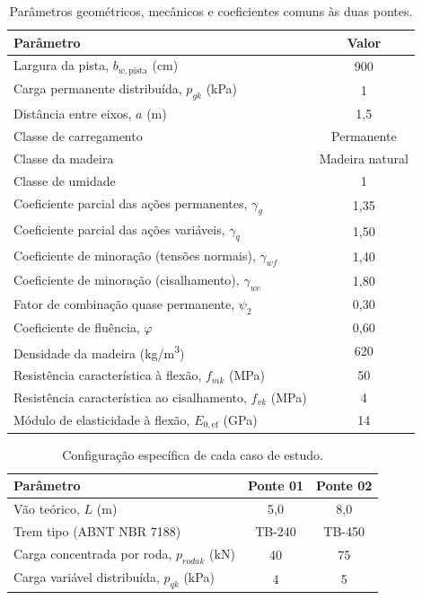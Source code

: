 \begin{table}[!ht]
\caption{Parâmetros geométricos, mecânicos e coeficientes comuns às duas pontes.\label{tab:parametros}}
\begin{threeparttable}
\begin{tabular*}{\columnwidth}{@{\extracolsep\fill}lc@{\extracolsep\fill}}
\toprule
Parâmetro & Valor \\
\midrule
Largura da pista, $b_{w,\mathrm{pista}}$ (cm) & 900 \\
Carga permanente distribuída, $p_{gk}$ (kPa) & 1 \\
Distância entre eixos, $a$ (m) & 1{,}5 \\
Classe de carregamento & Permanente \\
Classe da madeira & Madeira natural \\
Classe de umidade & 1 \\
Coeficiente parcial das ações permanentes, $\gamma_g$ & 1{,}35 \\
Coeficiente parcial das ações variáveis, $\gamma_q$ & 1{,}50 \\
Coeficiente de minoração (tensões normais), $\gamma_{wf}$ & 1{,}40 \\
Coeficiente de minoração (cisalhamento), $\gamma_{wc}$ & 1{,}80 \\
Fator de combinação quase permanente, $\psi_2$ & 0{,}30 \\
Coeficiente de fluência, $\varphi$ & 0{,}60 \\
Densidade da madeira (kg/m\textsuperscript{3}) & 620 \\
Resistência característica à flexão, $f_{mk}$ (MPa) & 50 \\
Resistência característica ao cisalhamento, $f_{vk}$ (MPa) & 4 \\
Módulo de elasticidade à flexão, $E_{0,\mathrm{ef}}$ (GPa) & 14 \\
\bottomrule
\end{tabular*}
\end{threeparttable}
\end{table}

\begin{table}[!ht]
\caption{Configuração específica de cada caso de estudo.\label{tab:casos}}
\begin{threeparttable}
\begin{tabular*}{\columnwidth}{@{\extracolsep\fill}lcc@{\extracolsep\fill}}
\toprule
Parâmetro & Ponte 01 & Ponte 02 \\
\midrule
Vão teórico, $L$ (m) & 5{,}0 & 8{,}0 \\
Trem tipo (ABNT NBR 7188) & TB-240 & TB-450 \\
Carga concentrada por roda, $p_{rodak}$ (kN) & 40 & 75 \\
Carga variável distribuída, $p_{qk}$ (kPa) & 4 & 5 \\
\bottomrule
\end{tabular*}
\end{threeparttable}
\end{table}

